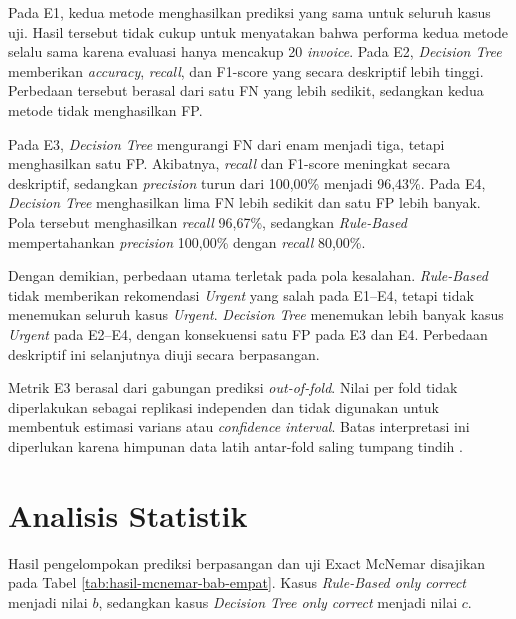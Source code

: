 Pada E1, kedua metode menghasilkan prediksi yang sama untuk seluruh kasus uji. Hasil tersebut tidak cukup untuk menyatakan bahwa performa kedua metode selalu sama karena evaluasi hanya mencakup 20 \textit{invoice}. Pada E2, \textit{Decision Tree} memberikan \textit{accuracy}, \textit{recall}, dan F1-score yang secara deskriptif lebih tinggi. Perbedaan tersebut berasal dari satu FN yang lebih sedikit, sedangkan kedua metode tidak menghasilkan FP.

Pada E3, \textit{Decision Tree} mengurangi FN dari enam menjadi tiga, tetapi menghasilkan satu FP. Akibatnya, \textit{recall} dan F1-score meningkat secara deskriptif, sedangkan \textit{precision} turun dari 100,00\% menjadi 96,43\%. Pada E4, \textit{Decision Tree} menghasilkan lima FN lebih sedikit dan satu FP lebih banyak. Pola tersebut menghasilkan \textit{recall} 96,67\%, sedangkan \textit{Rule-Based} mempertahankan \textit{precision} 100,00\% dengan \textit{recall} 80,00\%.

Dengan demikian, perbedaan utama terletak pada pola kesalahan. \textit{Rule-Based} tidak memberikan rekomendasi \textit{Urgent} yang salah pada E1--E4, tetapi tidak menemukan seluruh kasus \textit{Urgent}. \textit{Decision Tree} menemukan lebih banyak kasus \textit{Urgent} pada E2--E4, dengan konsekuensi satu FP pada E3 dan E4. Perbedaan deskriptif ini selanjutnya diuji secara berpasangan.

Metrik E3 berasal dari gabungan prediksi \textit{out-of-fold}. Nilai per fold tidak diperlakukan sebagai replikasi independen dan tidak digunakan untuk membentuk estimasi varians atau \textit{confidence interval}. Batas interpretasi ini diperlukan karena himpunan data latih antar-fold saling tumpang tindih \cite{BatesEtAl2024CV}.

\FloatBarrier

\section{Analisis Statistik}

Hasil pengelompokan prediksi berpasangan dan uji Exact McNemar disajikan pada Tabel \ref{tab:hasil-mcnemar-bab-empat}. Kasus \textit{Rule-Based only correct} menjadi nilai $b$, sedangkan kasus \textit{Decision Tree only correct} menjadi nilai $c$.

